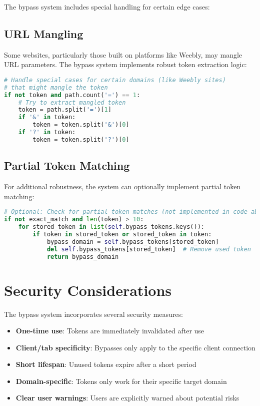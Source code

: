 The bypass system includes special handling for certain edge cases:

\subsection{URL Mangling}
Some websites, particularly those built on platforms like Weebly, may mangle URL parameters. The bypass system implements robust token extraction logic:

\begin{lstlisting}[language=Python]
# Handle special cases for certain domains (like Weebly sites)
# that might mangle the token
if not token and path.count('=') == 1:
    # Try to extract mangled token
    token = path.split('=')[1]
    if '&' in token:
        token = token.split('&')[0]
    if '?' in token:
        token = token.split('?')[0]
\end{lstlisting}

\subsection{Partial Token Matching}
For additional robustness, the system can optionally implement partial token matching:

\begin{lstlisting}[language=Python]
# Optional: Check for partial token matches (not implemented in code above)
if not exact_match and len(token) > 10:
    for stored_token in list(self.bypass_tokens.keys()):
        if token in stored_token or stored_token in token:
            bypass_domain = self.bypass_tokens[stored_token]
            del self.bypass_tokens[stored_token]  # Remove used token
            return bypass_domain
\end{lstlisting}

\section{Security Considerations}

The bypass system incorporates several security measures:

\begin{itemize}
    \item \textbf{One-time use}: Tokens are immediately invalidated after use
    \item \textbf{Client/tab specificity}: Bypasses only apply to the specific client connection
    \item \textbf{Short lifespan}: Unused tokens expire after a short period
    \item \textbf{Domain-specific}: Tokens only work for their specific target domain
    \item \textbf{Clear user warnings}: Users are explicitly warned about potential risks
\end{itemize}

